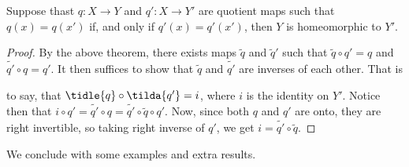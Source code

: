 \begin{corollary}
    Suppose thast $q:X \rightarrow Y$ and $q':X \rightarrow Y'$ are quotient
    maps such that $q(x)=q(x')$ if, and only if $q'(x)=q'(x')$, then $Y$ is
    homeomorphic to $Y'$.
\end{corollary}
\begin{proof}
    By the above theorem, there exists maps $\tilde{q}$ and $\tilde{q}'$ such
    that $\tilde{q} \circ q'=q$ and $\tilde{q'} \circ q=q'$. It then suffices to
    show that $\tilde{q}$ and $\tilde{q'}$ are inverses of each other. That is

    to say, that $\tidle{q} \circ \tilda{q'}=i$, where $i$ is the identity on
    $Y'$. Notice then that  $i \circ q'=\tilde{q'} \circ q=\tilde{q'} \circ
    \tilde{q} \circ q'$. Now, since both $q$ and  $q'$ are onto, they are right
    invertible, so taking right inverse of $q'$, we get $i=\tilde{q'} \circ
    \tilde{q}$.
\end{proof}

We conclude with some examples and extra results.

